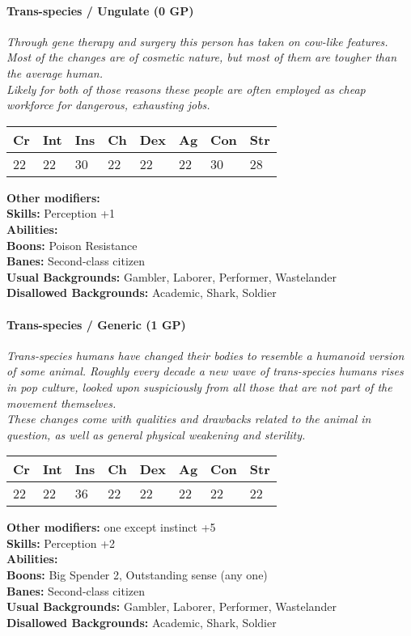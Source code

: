 \hrulefill
\paragraph*{Trans-species / Ungulate (0 GP)}
\textit{Through gene therapy and surgery this person has taken on cow-like features. Most of the changes are of cosmetic nature, but most of them are tougher than the average human.\\
	Likely for both of those reasons these people are often employed as cheap workforce for dangerous, exhausting jobs.}\par
\begin{tabular}{|l|l|l|l|l|l|l|l|}
	\hline
	Cr & Int & Ins & Ch & Dex & Ag & Con & Str \\ \hline
	22 & 22 & 30 & 22 & 22 & 22 & 30 & 28 \\ \hline
\end{tabular}\par
\noindent\textbf{Other modifiers:} \\
\textbf{Skills:} Perception +1\\
\textbf{Abilities:} \\
\textbf{Boons:} Poison Resistance\\
\textbf{Banes:} Second-class citizen\\
\textbf{Usual Backgrounds:} Gambler, Laborer, Performer, Wastelander\\
\textbf{Disallowed Backgrounds:} Academic, Shark, Soldier

\hrulefill
\paragraph*{Trans-species / Generic (1 GP)}
\textit{Trans-species humans have changed their bodies to resemble a humanoid version of some animal. Roughly every decade a new wave of trans-species humans rises in pop culture, looked upon suspiciously from all those that are not part of the movement themselves.\\
	These changes come with qualities and drawbacks related to the animal in question, as well as general physical weakening and sterility.}\par
\begin{tabular}{|l|l|l|l|l|l|l|l|}
	\hline
	Cr & Int & Ins & Ch & Dex & Ag & Con & Str \\ \hline
	22 & 22 & 36 & 22 & 22 & 22 & 22 & 22 \\ \hline
\end{tabular}\par
\noindent\textbf{Other modifiers:} one except instinct +5\\
\textbf{Skills:} Perception +2\\
\textbf{Abilities:} \\
\textbf{Boons:} Big Spender 2, Outstanding sense (any one)\\
\textbf{Banes:} Second-class citizen\\
\textbf{Usual Backgrounds:} Gambler, Laborer, Performer, Wastelander\\
\textbf{Disallowed Backgrounds:} Academic, Shark, Soldier

